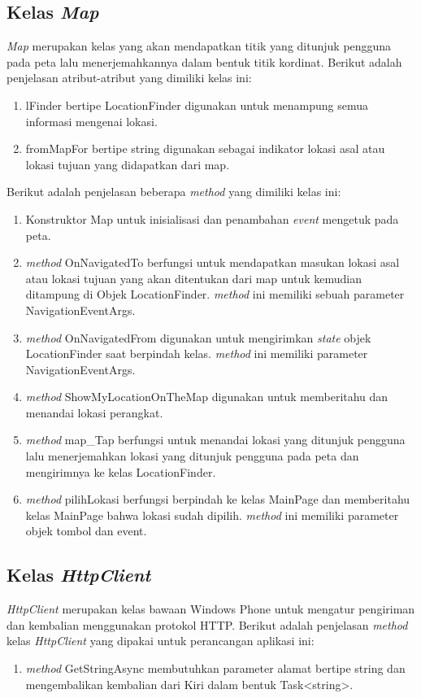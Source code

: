 \subsection{Kelas \textit{Map}}
\label{lab:Kelas Map}
\hspace{0.5cm} \textit{Map} merupakan kelas yang akan mendapatkan titik yang ditunjuk pengguna pada peta lalu menerjemahkannya dalam bentuk titik kordinat. Berikut adalah penjelasan atribut-atribut yang dimiliki kelas ini:
\begin{enumerate}
	\item lFinder bertipe LocationFinder digunakan untuk menampung semua informasi mengenai lokasi.
	\item fromMapFor bertipe string digunakan sebagai indikator lokasi asal atau lokasi tujuan yang didapatkan dari map.
\end{enumerate}

Berikut adalah penjelasan beberapa \textit{method} yang dimiliki kelas ini:
\begin{enumerate}
	\item Konstruktor Map untuk inisialisasi dan penambahan \textit{event} mengetuk pada peta.
	\item \textit{method} OnNavigatedTo berfungsi untuk mendapatkan masukan lokasi asal atau lokasi tujuan yang akan ditentukan dari map untuk kemudian ditampung di Objek LocationFinder. \textit{method} ini memiliki sebuah parameter NavigationEventArgs.
	\item \textit{method} OnNavigatedFrom digunakan untuk mengirimkan \textit{state} objek LocationFinder saat berpindah kelas. \textit{method} ini memiliki parameter NavigationEventArgs.
	\item \textit{method} ShowMyLocationOnTheMap digunakan untuk memberitahu dan menandai lokasi perangkat.
	\item \textit{method} map\_Tap berfungsi untuk menandai lokasi yang ditunjuk pengguna lalu  menerjemahkan lokasi yang ditunjuk pengguna pada peta dan mengirimnya ke kelas LocationFinder.
	\item \textit{method} pilihLokasi berfungsi berpindah ke kelas MainPage dan memberitahu kelas MainPage bahwa lokasi sudah dipilih. \textit{method} ini memiliki parameter objek tombol dan event.
\end{enumerate}

\subsection{Kelas \textit{HttpClient}}
\label{lab:Kelas HttpClient}
\hspace{0.5cm} \textit{HttpClient} merupakan kelas bawaan Windows Phone untuk mengatur pengiriman dan kembalian menggunakan protokol HTTP. Berikut adalah penjelasan \textit{method} kelas \textit{HttpClient} yang dipakai untuk perancangan aplikasi ini:
\begin{enumerate}
	\item \textit{method} GetStringAsync membutuhkan parameter alamat bertipe string dan mengembalikan kembalian dari Kiri dalam bentuk Task<string>.
\end{enumerate}

